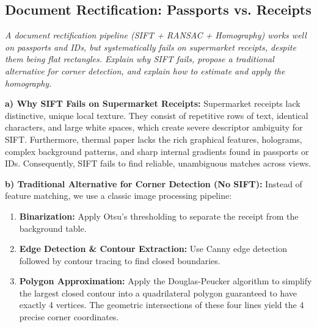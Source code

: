 \subsection[Question -- {\it Document Rectification: Passports vs. Receipts}]{}

\subsection{Document Rectification: Passports vs. Receipts}
\textit{A document rectification pipeline (SIFT + RANSAC + Homography) works well on passports and IDs, but systematically fails on supermarket receipts, despite them being flat rectangles. Explain why SIFT fails, propose a traditional alternative for corner detection, and explain how to estimate and apply the homography.}

\textbf{a) Why SIFT Fails on Supermarket Receipts:}
Supermarket receipts lack distinctive, unique local texture. They consist of repetitive rows of text, identical characters, and large white spaces, which create severe descriptor ambiguity for SIFT. Furthermore, thermal paper lacks the rich graphical features, holograms, complex background patterns, and sharp internal gradients found in passports or IDs. Consequently, SIFT fails to find reliable, unambiguous matches across views.

\textbf{b) Traditional Alternative for Corner Detection (No SIFT):}
Instead of feature matching, we use a classic image processing pipeline:
\begin{enumerate}
    \item \textbf{Binarization:} Apply Otsu's thresholding to separate the receipt from the background table.
    \item \textbf{Edge Detection \& Contour Extraction:} Use Canny edge detection followed by contour tracing to find closed boundaries.
    \item \textbf{Polygon Approximation:} Apply the Douglas-Peucker algorithm to simplify the largest closed contour into a quadrilateral polygon guaranteed to have exactly 4 vertices. The geometric intersections of these four lines yield the 4 precise corner coordinates.
\end{enumerate}

